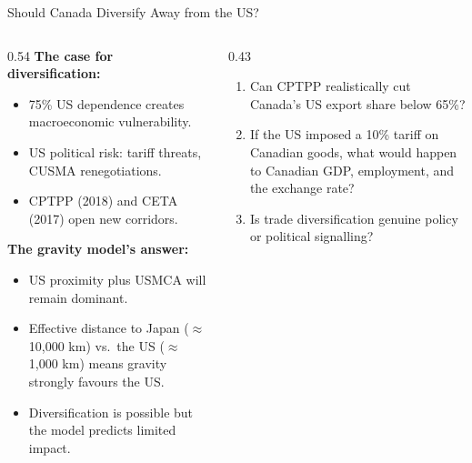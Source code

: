 \documentclass[aspectratio=169]{beamer}
\begin{document}
\begin{frame}{Should Canada Diversify Away from the US?}
\begin{columns}[T]
\begin{column}{0.54\textwidth}
\textbf{The case for diversification:}
\begin{itemize}\small
  \item 75\% US dependence creates macroeconomic vulnerability.
  \item US political risk: tariff threats, CUSMA renegotiations.
  \item CPTPP (2018) and CETA (2017) open new corridors.
\end{itemize}
\vspace{0.2em}
\textbf{The gravity model's answer:}
\begin{itemize}\small
  \item US proximity plus USMCA will remain dominant.
  \item Effective distance to Japan ($\approx$10{,}000 km) vs.\ the US ($\approx$1{,}000 km) means gravity strongly favours the US.
  \item Diversification is possible but the model predicts limited impact.
\end{itemize}
\end{column}
\begin{column}{0.43\textwidth}
\begin{discuss}
\footnotesize
\begin{enumerate}\footnotesize
  \item Can CPTPP realistically cut Canada's US export share below 65\%?
  \item If the US imposed a 10\% tariff on Canadian goods, what would happen to Canadian GDP, employment, and the exchange rate?
  \item Is trade diversification genuine policy or political signalling?
\end{enumerate}
\end{discuss}
\end{column}
\end{columns}
\end{frame}

\end{document}
